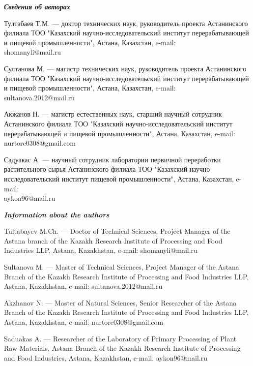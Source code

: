 \begin{authorinfo}
\emph{{\bfseries Сведения об авторах}}  

Тултабаев Т.М. — доктор технических наук, руководитель проекта
Астанинского филиала ТОО "Казахский научно-исследовательский институт
перерабатывающей и пищевой промышленности", Астана, Казахстан, e-mail:\\
shomanyli@mail.ru

Султанова М. — магистр технических наук, руководитель проекта
Астанинского филиала ТОО "Казахский научно-исследовательский институт
перерабатывающей и пищевой промышленности", Астана, Казахстан, e-mail:\\
sultanova.2012@mail.ru

Акжанов Н. — магистр естественных наук, старший научный сотрудник
Астанинского филиала ТОО "Казахский научно-исследовательский институт
перерабатывающей и пищевой промышленности", Астана, Казахстан, e-mail:\\
nurtore0308@gmail.com

Садуакас А. — научный сотрудник лаборатории первичной переработки
растительного сырья Астанинского филиала ТОО "Казахский
научно-исследовательский институт пищевой промышленности", Астана,
Казахстан, e-mail: \\aykon96@mail.ru

\emph{{\bfseries Information about the authors}}  

Tultabayev M.Ch. — Doctor of Technical Sciences, Project Manager of
the Astana branch of the Kazakh Research Institute of Processing and
Food Industries LLP, Astana, Kazakhstan, e-mail: shomanyli@mail.ru

Sultanova M. — Master of Technical Sciences, Project Manager of the
Astana Branch of the Kazakh Research Institute of Processing and Food
Industries LLP, Astana, Kazakhstan, e-mail: sultanova.2012@mail.ru

Akzhanov N. — Master of Natural Sciences, Senior Researcher of the
Astana Branch of the Kazakh Research Institute of Processing and Food
Industries LLP, Astana, Kazakhstan, e-mail: nurtore0308@gmail.com

Saduakas A. — Researcher of the Laboratory of Primary Processing of
Plant Raw Materials, Astana Branch of the Kazakh Research Institute of
Processing and Food Industries, Astana, Kazakhstan, e-mail:
aykon96@mail.ru
\end{authorinfo}
